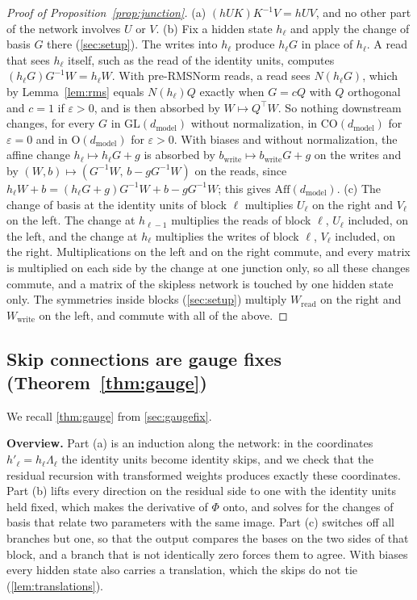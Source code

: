 \documentclass[10pt]{article}
\theoremstyle{definition}
\theoremstyle{remark}
\newcommand{\Wread}{W_{\mathrm{read}}}
\newcommand{\Wwrite}{W_{\mathrm{write}}}
\newcommand{\dm}{d_{\mathrm{model}}}
\newcommand{\GL}{\mathrm{GL}}
\newcommand{\Ort}{\mathrm{O}}
\newcommand{\CO}{\mathrm{CO}}
\newcommand{\Aff}{\mathrm{Aff}}
\newcommand{\para}[1]{\smallskip\noindent\textbf{#1}\hspace{0.5em}}
\begin{document}
\begin{proof}[Proof of Proposition~\ref{prop:junction}]
(a) $(hUK)K^{-1}V = hUV$, and no other part of the network involves $U$ or $V$.
(b) Fix a hidden state $h_{\ell}$ and apply the change of basis $G$ there (\cref{sec:setup}). The writes into $h_{\ell}$ produce $h_\ell G$ in place of $h_\ell$. A read that sees $h_\ell$ itself, such as the read of the identity units, computes $(h_\ell G)G^{-1}W = h_\ell W$. With pre-RMSNorm reads, a read sees $N(h_\ell G)$, which by Lemma~\ref{lem:rms} equals $N(h_\ell)Q$ exactly when $G = cQ$ with $Q$ orthogonal and $c = 1$ if $\varepsilon > 0$, and is then absorbed by $W \mapsto Q^\top W$. So nothing downstream changes, for every $G$ in $\GL(\dm)$ without normalization, in $\CO(\dm)$ for $\varepsilon = 0$ and in $\Ort(\dm)$ for $\varepsilon > 0$. With biases and without normalization, the affine change $h_\ell \mapsto h_\ell G + g$ is absorbed by $b_{\mathrm{write}} \mapsto b_{\mathrm{write}}G + g$ on the writes and by $(W, b) \mapsto (G^{-1}W,\, b - gG^{-1}W)$ on the reads, since $h_\ell W + b = (h_\ell G + g)G^{-1}W + b - gG^{-1}W$; this gives $\Aff(\dm)$.
(c) The change of basis at the identity units of block $\ell$ multiplies $U_\ell$ on the right and $V_\ell$ on the left. The change at $h_{\ell-1}$ multiplies the reads of block $\ell$, $U_\ell$ included, on the left, and the change at $h_\ell$ multiplies the writes of block $\ell$, $V_\ell$ included, on the right. Multiplications on the left and on the right commute, and every matrix is multiplied on each side by the change at one junction only, so all these changes commute, and a matrix of the skipless network is touched by one hidden state only. The symmetries inside blocks (\cref{sec:setup}) multiply $\Wread$ on the right and $\Wwrite$ on the left, and commute with all of the above.
\end{proof}

\subsection{Skip connections are gauge fixes\texorpdfstring{ (Theorem~\ref*{thm:gauge})}{}}\label{app:prf-gauge}

We recall \cref{thm:gauge} from \cref{sec:gaugefix}.
\thmGauge*

\para{Overview.} Part (a) is an induction along the network: in the coordinates $h'_\ell = h_\ell\Lambda_\ell$ the identity units become identity skips, and we check that the residual recursion with transformed weights produces exactly these coordinates. Part (b) lifts every direction on the residual side to one with the identity units held fixed, which makes the derivative of $\Phi$ onto, and solves for the changes of basis that relate two parameters with the same image. Part (c) switches off all branches but one, so that the output compares the bases on the two sides of that block, and a branch that is not identically zero forces them to agree. With biases every hidden state also carries a translation, which the skips do not tie (\cref{lem:translations}).
\end{document}
